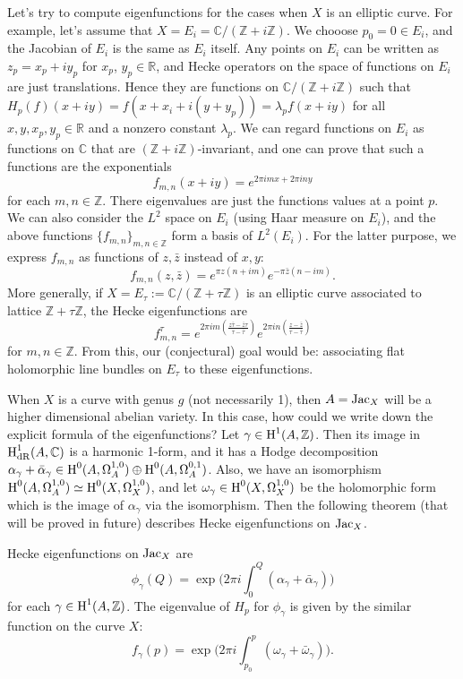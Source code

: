 Let's try to compute eigenfunctions for the cases when $X$ is an elliptic curve.
For example, let's assume that $X = E_i = \mathbb{C} / (\mathbb{Z} + i\mathbb{Z})$.
We chooose $p_0 = 0 \in E_i$, and the Jacobian of $E_i$ is the same as $E_i$ itself.
Any points on $E_i$ can be written as $z_p = x_p + iy_p$ for $x_p$, $y_p \in \mathbb{R}$, 
and Hecke operators on the space of functions on $E_i$ are just translations.
Hence they are functions on $\mathbb{C} / (\mathbb{Z} + i\mathbb{Z})$ such that 
$H_p(f)(x + iy) = f(x + x_i + i(y + y_p)) = \lambda_p f(x + iy)$ for all $x, y, x_p, y_p \in \mathbb{R}$ and a nonzero constant $\lambda_p$.
We can regard functions on $E_i$ as functions on $\mathbb{C}$ that are $(\mathbb{Z} + i\mathbb{Z})$-invariant, and 
one can prove that such a functions are the exponentials
$$
f_{m, n}(x + iy) = e^{2\pi i mx + 2\pi i ny}
$$
for each $m, n \in \mathbb{Z}$.
There eigenvalues are just the functions values at a point $p$.
We can also consider the $L^2$ space on $E_i$ (using Haar measure on $E_i$),
and the above functions $\{f_{m, n}\}_{m, n \in \mathbb{Z}}$ form a basis of $L^2(E_i)$.
For the latter purpose, we express $f_{m, n}$ as functions of $z, \bar{z}$ instead of $x, y$:
$$
f_{m,n}(z, \bar z) = e^{\pi z(n + im)}e^{-\pi \bar z (n - im)}.
$$
More generally, if $X = E_\tau:= \mathbb{C}/(\mathbb{Z} + \tau \mathbb{Z})$ is an elliptic curve associated to lattice $\mathbb{Z} + \tau\mathbb{Z}$,
the Hecke eigenfunctions are
$$
f_{m,n}^\tau = e^{2\pi i m \left(\frac{z \bar \tau - \bar z \tau}{\tau - \bar \tau}\right)} e^{2\pi i n \left(\frac{z - \bar z}{\tau - \bar \tau}\right)}
$$
for $m, n \in \mathbb{Z}$.
From this, our (conjectural) goal would be: associating flat holomorphic line bundles on $E_\tau$ to these eigenfunctions.

When $X$ is a curve with genus $g$ (not necessarily 1), 
then $A = \operatorname{\mathrm{Jac}}_X$ will be a higher dimensional abelian variety.
In this case, how could we write down the explicit formula of the eigenfunctions?
Let $\gamma \in \operatorname{\mathrm{H}}^1(A, \mathbb{Z})$.
Then its image in $\operatorname{\mathrm{H}}^1_{\mathrm{dR}}(A, \mathbb{C})$ is a harmonic 1-form, and it has a Hodge decomposition
$\alpha_\gamma +\bar\alpha_\gamma \in \operatorname{\mathrm{H}}^0(A, \Omega_A^{1, 0})\oplus \operatorname{\mathrm{H}}^0(A, \Omega_A^{0, 1})$.
Also, we have an isomorphism $\operatorname{\mathrm{H}}^0(A, \Omega^{1, 0}_A) \simeq \operatorname{\mathrm{H}}^0(X, \Omega_X^{1, 0})$, and let $\omega_\gamma \in \operatorname{\mathrm{H}}^0(X, \Omega_X^{1, 0})$
be the holomorphic form which is the image of $\alpha_\gamma$ via the isomorphism.
Then the following theorem (that will be proved in future) describes Hecke eigenfunctions on $\operatorname{\mathrm{Jac}}_X$.
\begin{theorem}
    Hecke eigenfunctions on $\operatorname{\mathrm{Jac}}_X$ are
    $$
    \phi_\gamma(Q) = \exp \bigg(2 \pi i \int_0^Q (\alpha_\gamma + \bar\alpha_\gamma)\bigg)
    $$
    for each $\gamma \in \operatorname{\mathrm{H}}^1(A, \mathbb{Z})$.
    The eigenvalue of $H_p$ for $\phi_\gamma$ is given by the similar function on the curve $X$:
    $$
    f_\gamma(p) = \exp \bigg(2\pi i \int_{p_0}^{p} (\omega_\gamma + \bar\omega_\gamma)\bigg).
    $$
\end{theorem}